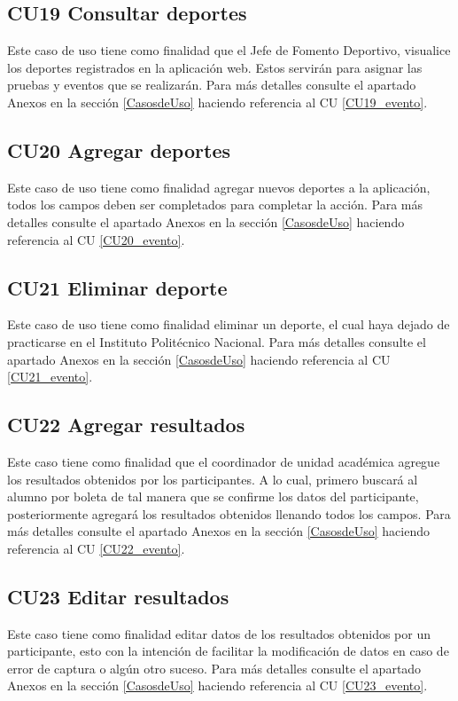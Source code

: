 		\subsection{CU19 Consultar deportes}
		\noindent Este caso de uso tiene como finalidad que el Jefe de Fomento Deportivo, visualice los deportes registrados en la aplicación web. Estos servirán para asignar las pruebas y eventos que se realizarán. Para más detalles consulte el apartado Anexos en la sección \ref{CasosdeUso} haciendo referencia al CU \ref{CU19_evento}.\\
		
		\subsection{CU20 Agregar deportes}
		\noindent Este caso de uso tiene como finalidad agregar nuevos deportes a la aplicación, todos los campos  deben ser completados para completar la acción. Para más detalles consulte el apartado Anexos en la sección \ref{CasosdeUso} haciendo referencia al CU \ref{CU20_evento}.\\
		
		\subsection{CU21 Eliminar deporte}
		\noindent Este caso de uso tiene como finalidad eliminar un deporte, el cual haya dejado de practicarse en el Instituto Politécnico Nacional. Para más detalles consulte el apartado Anexos en la sección \ref{CasosdeUso} haciendo referencia al CU \ref{CU21_evento}.\\
		
		\subsection{CU22 Agregar resultados}
		\noindent Este caso tiene como finalidad que el coordinador de unidad académica agregue los resultados obtenidos por los participantes. A lo cual, primero buscará al alumno por boleta de tal manera que se confirme los datos del participante, posteriormente agregará los resultados obtenidos llenando todos los campos. Para más detalles consulte el apartado Anexos en la sección \ref{CasosdeUso} haciendo referencia al CU \ref{CU22_evento}.\\
		
		\subsection{CU23 Editar resultados}
		\noindent Este caso tiene como finalidad editar datos de los resultados obtenidos por un participante, esto con la intención de facilitar la modificación de datos en caso de error de captura o algún otro suceso. Para más detalles consulte el apartado Anexos en la sección \ref{CasosdeUso} haciendo referencia al CU \ref{CU23_evento}.
		\\
		
